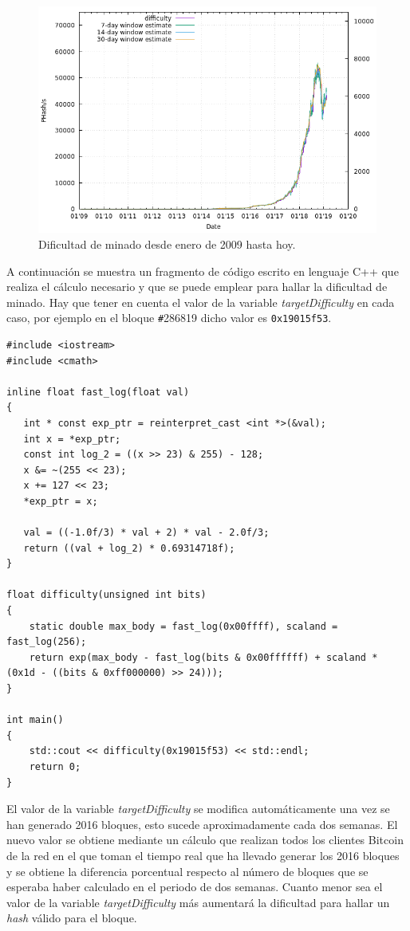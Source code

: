 \documentclass{article}
\begin{document}
\begin{enumerate}
        \begin{figure}[H]
        \centering
            \includegraphics[scale=0.51]{img/Bitcoin_TargetDifficulty.png}
            \caption{Dificultad de minado desde enero de 2009 hasta hoy.}
        \end{figure}
        
        A continuación se muestra un fragmento de código escrito en lenguaje C++ que realiza el cálculo necesario y que se puede emplear para hallar la dificultad de minado. Hay que tener en cuenta el valor de la variable \textit{targetDifficulty} en cada caso, por ejemplo en el bloque \texttt{\#}286819 dicho valor es \texttt{0x19015f53}.
        
        \begin{verbatim}
#include <iostream>
#include <cmath>

inline float fast_log(float val)
{
   int * const exp_ptr = reinterpret_cast <int *>(&val);
   int x = *exp_ptr;
   const int log_2 = ((x >> 23) & 255) - 128;
   x &= ~(255 << 23);
   x += 127 << 23;
   *exp_ptr = x;

   val = ((-1.0f/3) * val + 2) * val - 2.0f/3;
   return ((val + log_2) * 0.69314718f);
}

float difficulty(unsigned int bits)
{
    static double max_body = fast_log(0x00ffff), scaland = fast_log(256);
    return exp(max_body - fast_log(bits & 0x00ffffff) + scaland * (0x1d - ((bits & 0xff000000) >> 24)));
}

int main()
{
    std::cout << difficulty(0x19015f53) << std::endl;
    return 0;
}
        \end{verbatim}
        
        El valor de la variable \textit{targetDifficulty} se modifica automáticamente una vez se han generado 2016 bloques, esto sucede aproximadamente cada dos semanas. El nuevo valor se obtiene mediante un cálculo que realizan todos los clientes Bitcoin de la red en el que toman el tiempo real que ha llevado generar los 2016 bloques y se obtiene la diferencia porcentual respecto al número de bloques que se esperaba haber calculado en el periodo de dos semanas. Cuanto menor sea el valor de la variable \textit{targetDifficulty} más aumentará la dificultad para hallar un \textit{hash} válido para el bloque.
        

\end{enumerate}
\end{document}
